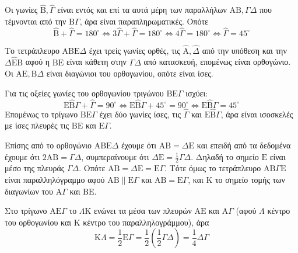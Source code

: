 \begin{alist}
    \item Οι γωνίες $\hat{\mathrm{B}}, \hat{\Gamma}$ είναι εντός και επί τα αυτά μέρη των παραλλήλων $\mathrm{A}\mathrm{B}, \Gamma\Delta$ που τέμνονται από την $\mathrm{B}\Gamma$, άρα είναι παραπληρωματικές. Οπότε 
    \[ \hat{\mathrm{B}} + \hat{\Gamma} = 180^\circ \Leftrightarrow 3\hat{\Gamma} + \hat{\Gamma} = 180^\circ \Leftrightarrow 4\hat{\Gamma} = 180^\circ \Leftrightarrow \hat{\Gamma} = 45^\circ \]
    
    \item Το τετράπλευρο $\mathrm{A}\mathrm{B}\mathrm{E}\Delta$ έχει τρείς γωνίες ορθές, τις $\hat{\mathrm{A}}, \hat{\Delta}$ από την υπόθεση και την $\Delta\hat{\mathrm{E}}\mathrm{B}$ αφού η $\mathrm{B}\mathrm{E}$ είναι κάθετη στην $\Gamma\Delta$ από κατασκευή, επομένως είναι ορθογώνιο. Οι $\mathrm{A}\mathrm{E}, \mathrm{B}\Delta$ είναι διαγώνιοι του ορθογωνίου, οπότε είναι ίσες.
    
    \item Για τις οξείες γωνίες του ορθογωνίου τριγώνου $\mathrm{B}\mathrm{E}\Gamma$ ισχύει:
    \[ \mathrm{E}\hat{\mathrm{B}}\Gamma + \hat{\Gamma} = 90^\circ \Leftrightarrow \mathrm{E}\hat{\mathrm{B}}\Gamma + 45^\circ = 90^\circ \Leftrightarrow \mathrm{E}\hat{\mathrm{B}}\Gamma = 45^\circ \]
    Επομένως το τρίγωνο $\mathrm{B}\mathrm{E}\Gamma$ έχει δύο γωνίες ίσες, τις $\hat{\Gamma}$ και $\mathrm{E}\hat{\mathrm{B}}\Gamma$, άρα είναι ισοσκελές με ίσες πλευρές τις $\mathrm{B}\mathrm{E}$ και $\mathrm{E}\Gamma$.
    
    Επίσης από το ορθογώνιο $\mathrm{A}\mathrm{B}\mathrm{E}\Delta$ έχουμε ότι $\mathrm{A}\mathrm{B} = \Delta\mathrm{E}$ και επειδή από τα δεδομένα έχουμε ότι $2\mathrm{A}\mathrm{B} = \Gamma\Delta$, συμπεραίνουμε ότι $\Delta\mathrm{E} = \frac{1}{2}\Gamma\Delta$. Δηλαδή το σημείο $\mathrm{E}$ είναι μέσο της πλευράς $\Gamma\Delta$. Οπότε $\mathrm{A}\mathrm{B} = \Delta\mathrm{E} = \mathrm{E}\Gamma$. Τότε όμως το τετράπλευρο $\mathrm{A}\mathrm{B}\Gamma\mathrm{E}$ είναι παραλληλόγραμμο αφού $\mathrm{A}\mathrm{B} \parallel \mathrm{E}\Gamma$ και $\mathrm{A}\mathrm{B} = \mathrm{E}\Gamma$, και $\mathrm{K}$ το σημείο τομής των διαγωνίων του $\mathrm{A}\Gamma$ και $\mathrm{B}\mathrm{E}$. 
    
    Στο τρίγωνο $\mathrm{A}\mathrm{E}\Gamma$ το $\Lambda\mathrm{K}$ ενώνει τα μέσα των πλευρών $\mathrm{A}\mathrm{E}$ και $\mathrm{A}\Gamma$ (αφού $\Lambda$ κέντρο του ορθογωνίου και $\mathrm{K}$ κέντρο του παραλληλογράμμου), άρα
    \[ \mathrm{K}\Lambda = \frac{1}{2}\mathrm{E}\Gamma = \frac{1}{2}\left(\frac{1}{2}\Gamma\Delta\right) = \frac{1}{4}\Delta\Gamma \]
\end{alist}
